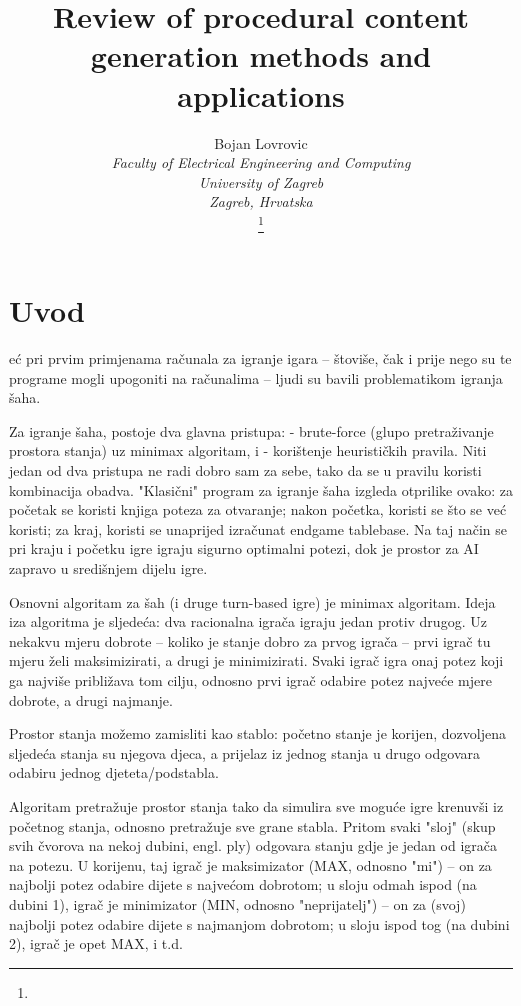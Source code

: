 \documentclass[journal]{IEEEtran}
\begin{document}
\title{Review of procedural content generation methods and applications}

\author{
Bojan Lovrovic\\
\textit{Faculty of Electrical Engineering and Computing}\\
\textit{University of Zagreb}\\
\textit{Zagreb, Hrvatska}

\thanks{}
}

\maketitle

\section{Uvod}
eć pri prvim primjenama računala za igranje igara -- štoviše, čak i
prije nego su te programe mogli upogoniti na računalima -- ljudi su bavili
problematikom igranja šaha.

Za igranje šaha, postoje dva glavna pristupa:
 - brute-force (glupo pretraživanje prostora stanja) uz minimax algoritam, i
 - korištenje heurističkih pravila.
Niti jedan od dva pristupa ne radi dobro sam za sebe, tako da se u pravilu
koristi kombinacija obadva.
"Klasični" program za igranje šaha izgleda otprilike ovako: za početak
se koristi knjiga poteza za otvaranje; nakon početka, koristi se što se
već koristi; za kraj, koristi se unaprijed izračunat endgame tablebase.
Na taj način se pri kraju i početku igre igraju sigurno optimalni potezi,
dok je prostor za AI zapravo u središnjem dijelu igre.

Osnovni algoritam za šah (i druge turn-based igre) je minimax algoritam.
Ideja iza algoritma je sljedeća: dva racionalna igrača igraju jedan protiv
drugog. Uz nekakvu mjeru dobrote -- koliko je stanje dobro za prvog igrača
-- prvi igrač tu mjeru želi maksimizirati, a drugi je minimizirati. Svaki
igrač igra onaj potez koji ga najviše približava tom cilju, odnosno prvi
igrač odabire potez najveće mjere dobrote, a drugi najmanje.

Prostor stanja možemo zamisliti kao stablo: početno stanje je korijen,
dozvoljena sljedeća stanja su njegova djeca, a prijelaz iz jednog stanja
u drugo odgovara odabiru jednog djeteta/podstabla.

Algoritam pretražuje prostor stanja tako da simulira sve moguće igre
krenuvši iz početnog stanja, odnosno pretražuje sve grane stabla.
Pritom svaki "sloj" (skup svih čvorova na nekoj dubini, engl. ply) odgovara
stanju gdje je jedan od igrača na potezu. U korijenu, taj igrač je
maksimizator (MAX, odnosno "mi") -- on za najbolji potez odabire dijete s
najvećom dobrotom; u sloju odmah ispod (na dubini 1), igrač je minimizator
(MIN, odnosno "neprijatelj") -- on za (svoj) najbolji potez odabire dijete s
najmanjom dobrotom; u sloju ispod tog (na dubini 2), igrač je opet MAX, i t.d.
\end{document}
